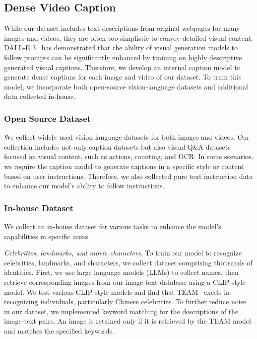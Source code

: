 \subsection{Dense Video Caption}
While our dataset includes text descriptions from original webpages for many images and videos, they are often too simplistic to convey detailed visual content.
DALL-E 3~\citep{BetkerImprovingIG} has demonstrated that the ability of visual generation models to follow prompts can be significantly enhanced by training on highly descriptive generated visual captions.
Therefore, we develop an internal caption model to generate dense captions for each image and video of our dataset.
To train this model, we incorporate both open-source vision-language datasets and additional data collected in-house.

\subsubsection{Open Source Dataset}
\label{sec:open_src_cap_data}
We collect widely used vision-language datasets for both images and videos.
Our collection includes not only caption datasets but also visual Q\&A datasets focused on visual content, such as actions, counting, and OCR.
In some scenarios, we require the caption model to generate captions in a specific style or content based on user instructions.
Therefore, we also collected pure text instruction data to enhance our model's ability to follow instructions.

\subsubsection{In-house Dataset}
\label{sec:in_house_cap_data}
We collect an in-house dataset for various tasks to enhance the model's capabilities in specific areas.

\emph{Celebrities, landmarks, and movie characters.}
To train our model to recognize celebrities, landmarks, and characters, we collect dataset comprising thousands of identities.
First, we use large language models (LLMs) to collect names, then retrieve corresponding images from our image-text database using a CLIP-style model.
We test various CLIP-style models and find that TEAM~\citep{TEAM2022MM} excels in recognizing individuals, particularly Chinese celebrities.
To further reduce noise in our dataset, we implemented keyword matching for the descriptions of the image-text pairs.
An image is retained only if it is retrieved by the TEAM model and matches the specified keywords.

